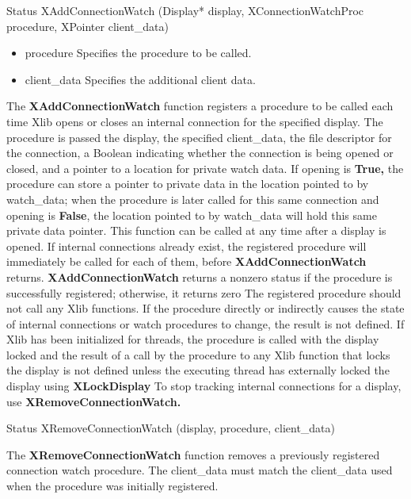 \documentclass{report}
\begin{document}
\begin{itemize}
\begin{cppcode}
                Status XAddConnectionWatch (Display* display, XConnectionWatchProc procedure, XPointer client_data)
            \end{cppcode}
            \bigbreak \noindent
            \begin{itemize}
                \item procedure Specifies the procedure to be called.
                \item client\_data Specifies the additional client data.
            \end{itemize}
            The \textbf{XAddConnectionWatch} function registers a procedure to be called each time Xlib opens or closes an internal connection for the specified display. The procedure is passed the display, the specified client\_data, the file descriptor for the connection, a Boolean indicating whether the connection is being opened or closed, and a pointer to a location for private watch data. If opening is \textbf{True,} the procedure can store a pointer to private data in the location pointed to by watch\_data; when the procedure is later called for this same connection and opening is \textbf{False}, the location pointed to by watch\_data will hold this same private data pointer.
            \bigbreak \noindent 
            This function can be called at any time after a display is opened. If internal connections already exist, the registered procedure will immediately be called for each of them, before \textbf{XAddConnectionWatch} returns. \textbf{XAddConnectionWatch} returns a nonzero status if the procedure is successfully registered; otherwise, it returns zero
            \bigbreak \noindent 
            The registered procedure should not call any Xlib functions. If the procedure directly or indirectly causes the state of internal connections or watch procedures to change, the result is not defined. If Xlib has been initialized for threads, the procedure is called with the display locked and the result of a call by the procedure to any Xlib function that locks the display is not defined unless the executing thread has externally locked the display using \textbf{XLockDisplay}
            \bigbreak \noindent 
            To stop tracking internal connections for a display, use \textbf{XRemoveConnectionWatch.}
            \bigbreak \noindent 
            \begin{cppcode}
                Status XRemoveConnectionWatch (display, procedure, client_data)
            \end{cppcode}
            \bigbreak \noindent 
            The \textbf{XRemoveConnectionWatch} function removes a previously registered connection watch procedure. The client\_data must match the client\_data used when the procedure was initially registered.

\end{itemize}
\end{document}
